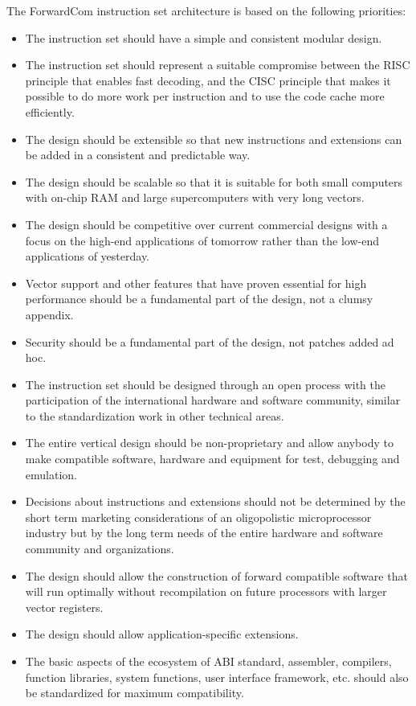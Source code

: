 \documentclass[forwardcom.tex]{subfiles}
\begin{document}
The ForwardCom instruction set architecture is based on the following priorities:
\begin{itemize}
\item The instruction set should have a simple and consistent modular design.
\item The instruction set should represent a suitable compromise between the RISC principle that enables fast decoding, and the CISC principle that makes it possible to do more work per instruction and to use the code cache more efficiently.
\item The design should be extensible so that new instructions and extensions can be added in a consistent and predictable way.
\item The design should be scalable so that it is suitable for both small computers with on-chip RAM and large supercomputers with very long vectors.
\item The design should be competitive over current commercial designs with a focus on the high-end applications of tomorrow rather than the low-end applications of yesterday.
\item Vector support and other features that have proven essential for high performance should be a fundamental part of the design, not a clumsy appendix.
\item Security should be a fundamental part of the design, not patches added ad hoc.
\item The instruction set should be designed through an open process with the participation of the international hardware and software community, similar to the standardization work in other technical areas.
\item The entire vertical design should be non-proprietary and allow anybody to make compatible software, hardware and equipment for test, debugging and emulation.
\item Decisions about instructions and extensions should not be determined by the short term marketing considerations of an oligopolistic microprocessor industry but by the long term needs of the entire hardware and software community and organizations.
\item The design should allow the construction of forward compatible software that will run optimally without recompilation on future processors with larger vector registers.
\item The design should allow application-specific extensions.
\item The basic aspects of the ecosystem of ABI standard, assembler, compilers, function libraries, system functions, user interface framework, etc. should also be standardized for maximum compatibility.
\end{itemize}
\end{document}
